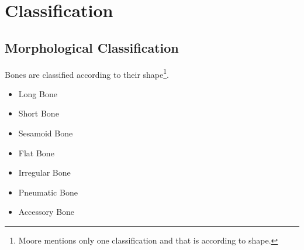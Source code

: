 \documentclass[11pt]{article}
\begin{document}
\section{Classification}
\subsection{Morphological Classification}
Bones are classified according to their shape\footnote{Moore mentions only one classification and that is according to shape.\cite{moore2023}}.
\begin{itemize}
    \item Long Bone
    \item Short Bone
    \item Sesamoid Bone
    \item Flat Bone
    \item Irregular Bone
    \item Pneumatic Bone
    \item Accessory Bone
\end{itemize}
\end{document}
